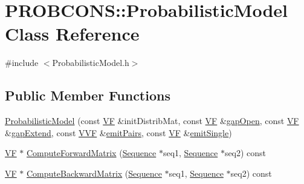 \hypertarget{class_p_r_o_b_c_o_n_s_1_1_probabilistic_model}{\section{P\+R\+O\+B\+C\+O\+N\+S\+:\+:Probabilistic\+Model Class Reference}
\label{class_p_r_o_b_c_o_n_s_1_1_probabilistic_model}
}


{\ttfamily \#include $<$Probabilistic\+Model.\+h$>$}

\subsection*{Public Member Functions}
\begin{DoxyCompactItemize}
\item 
\hyperlink{class_p_r_o_b_c_o_n_s_1_1_probabilistic_model_a3da5411c372c68eb4733229d597fe721}{Probabilistic\+Model} (const \hyperlink{namespace_p_r_o_b_c_o_n_s_a7d46b91dfef3fa4038545a492ad12221}{V\+F} \&init\+Distrib\+Mat, const \hyperlink{namespace_p_r_o_b_c_o_n_s_a7d46b91dfef3fa4038545a492ad12221}{V\+F} \&\hyperlink{namespace_p_r_o_b_c_o_n_s_aad90cbdf21742e0d50a23be886afbffe}{gap\+Open}, const \hyperlink{namespace_p_r_o_b_c_o_n_s_a7d46b91dfef3fa4038545a492ad12221}{V\+F} \&\hyperlink{namespace_p_r_o_b_c_o_n_s_ae1d3cf6541679992bb3dc1a89e0347d5}{gap\+Extend}, const \hyperlink{namespace_p_r_o_b_c_o_n_s_a64c77882f700f0f6e9426241c7d7ba1c}{V\+V\+F} \&\hyperlink{namespace_p_r_o_b_c_o_n_s_ae28575916501eeab36245ba0624d0640}{emit\+Pairs}, const \hyperlink{namespace_p_r_o_b_c_o_n_s_a7d46b91dfef3fa4038545a492ad12221}{V\+F} \&\hyperlink{namespace_p_r_o_b_c_o_n_s_a60ce52cd8ccb26631e13fecca788f13e}{emit\+Single})
\item 
\hyperlink{namespace_p_r_o_b_c_o_n_s_a7d46b91dfef3fa4038545a492ad12221}{V\+F} $\ast$ \hyperlink{class_p_r_o_b_c_o_n_s_1_1_probabilistic_model_a7cc73f2599d62d9ab5df9625a67a8899}{Compute\+Forward\+Matrix} (\hyperlink{class_p_r_o_b_c_o_n_s_1_1_sequence}{Sequence} $\ast$seq1, \hyperlink{class_p_r_o_b_c_o_n_s_1_1_sequence}{Sequence} $\ast$seq2) const 
\item 
\hyperlink{namespace_p_r_o_b_c_o_n_s_a7d46b91dfef3fa4038545a492ad12221}{V\+F} $\ast$ \hyperlink{class_p_r_o_b_c_o_n_s_1_1_probabilistic_model_ab6fc9a73a06abe1f3597f0bc7a073263}{Compute\+Backward\+Matrix} (\hyperlink{class_p_r_o_b_c_o_n_s_1_1_sequence}{Sequence} $\ast$seq1, \hyperlink{class_p_r_o_b_c_o_n_s_1_1_sequence}{Sequence} $\ast$seq2) const 

\end{DoxyCompactItemize}
